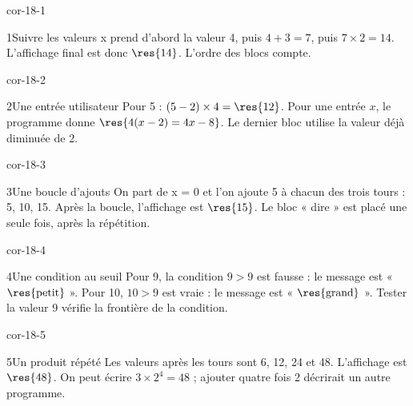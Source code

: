 \clearpage\pagestyle{otMain}\setlength{\otBlocEspacement}{2.5mm}\fontsize{11}{15}\selectfont{}
\begin{blocLivre}{cor-18-1}\begin{corrige}{1}{Suivre les valeurs}
x prend d’abord la valeur 4, puis $4+3=7$, puis $7\times2=14$. L’affichage final est donc $\res{14}$. L’ordre des blocs compte.
\label{fig-cor-18-1}
\end{corrige}\end{blocLivre}
\begin{blocLivre}{cor-18-2}\begin{corrige}{2}{Une entrée utilisateur}
Pour 5 : $(5-2)\times4=\res{12}$. Pour une entrée $x$, le programme donne $\res{4(x-2)=4x-8}$. Le dernier bloc utilise la valeur déjà diminuée de 2.
\label{fig-cor-18-2}
\end{corrige}\end{blocLivre}
\begin{blocLivre}{cor-18-3}\begin{corrige}{3}{Une boucle d’ajouts}
On part de x = 0 et l’on ajoute 5 à chacun des trois tours : 5, 10, 15. Après la boucle, l’affichage est $\res{15}$. Le bloc « dire » est placé une seule fois, après la répétition.
\label{fig-cor-18-3}
\end{corrige}\end{blocLivre}
\begin{blocLivre}{cor-18-4}\begin{corrige}{4}{Une condition au seuil}
Pour 9, la condition $9>9$ est fausse : le message est « $\res{\text{petit}}$ ». Pour 10, $10>9$ est vraie : le message est « $\res{\text{grand}}$ ». Tester la valeur 9 vérifie la frontière de la condition.
\label{fig-cor-18-4}
\end{corrige}\end{blocLivre}
\begin{blocLivre}{cor-18-5}\begin{corrige}{5}{Un produit répété}
Les valeurs après les tours sont 6, 12, 24 et 48. L’affichage est $\res{48}$. On peut écrire $3\times2^4=48$ ; ajouter quatre fois 2 décrirait un autre programme.
\label{fig-cor-18-5}
\end{corrige}\end{blocLivre}
